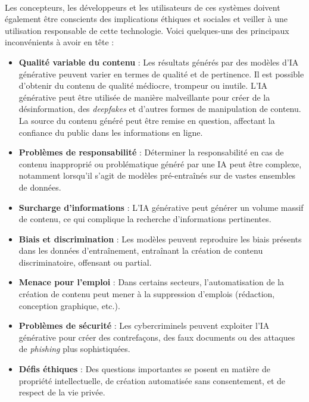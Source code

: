             \paragraph{}
                Les concepteurs, les développeurs et les utilisateurs de ces systèmes doivent également être conscients des implications éthiques et sociales et veiller à une utilisation responsable de cette technologie. Voici quelques-uns des principaux inconvénients à avoir en tête :
            \begin{itemize}[label=--]
                \item \textbf{Qualité variable du contenu} : Les résultats générés par des modèles d'IA générative peuvent varier en termes de qualité et de pertinence. Il est possible d'obtenir du contenu de qualité médiocre, trompeur ou inutile. L'IA générative peut être utilisée de manière malveillante pour créer de la désinformation, des \textit{deepfakes} et d'autres formes de manipulation de contenu. La source du contenu généré peut être remise en question, affectant la confiance du public dans les informations en ligne.
                
                \item \textbf{Problèmes de responsabilité} : Déterminer la responsabilité en cas de contenu inapproprié ou problématique généré par une IA peut être complexe, notamment lorsqu'il s'agit de modèles pré-entraînés sur de vastes ensembles de données.
                
                \item \textbf{Surcharge d'informations} : L'IA générative peut générer un volume massif de contenu, ce qui complique la recherche d'informations pertinentes.
                
                \item \textbf{Biais et discrimination} : Les modèles peuvent reproduire les biais présents dans les données d'entraînement, entraînant la création de contenu discriminatoire, offensant ou partial.
                
                \item \textbf{Menace pour l'emploi} : Dans certains secteurs, l'automatisation de la création de contenu peut mener à la suppression d'emplois (rédaction, conception graphique, etc.).
                
                \item \textbf{Problèmes de sécurité} : Les cybercriminels peuvent exploiter l'IA générative pour créer des contrefaçons, des faux documents ou des attaques de \textit{phishing} plus sophistiquées.
                
                \item \textbf{Défis éthiques} : Des questions importantes se posent en matière de propriété intellectuelle, de création automatisée sans consentement, et de respect de la vie privée.
            \end{itemize}
